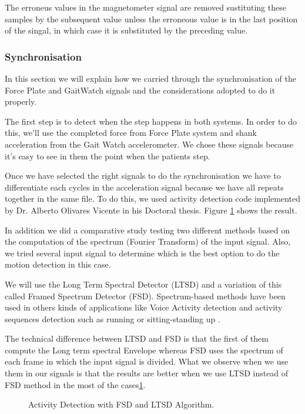 The erroneus values in the magnetometer signal are removed sustituting these samples by the subsequent value unless the erroneous value is in the last position of the singal, in which case it is substituted by the preceding value.

\subsubsection{Synchronisation}	
In this section we will explain how we carried through the synchronisation of the Force Plate and GaitWatch signals and the considerations adopted to do it properly.

The first step is to detect when the step happens in both systems. In order to do this, we’ll use the completed force from Force Plate system and shank acceleration from the Gait Watch accelerometer. We chose these signals because it’s easy to see in them the point when the patients step.

Once we have selected the right signals to do the synchronisation we have to differentiate each cycles in the acceleration signal because we have all repeats together in the same file. To do this, we used activity detection code implemented by Dr. Alberto Olivares Vicente in his Doctoral thesis. Figure \ref{fig:activityDetection} shows the result.

In addition we did a comparative study testing two different methods based on the  computation of the spectrum (Fourier Transform) of the input signal. Also, we tried several input signal to determine which is the best option to do the motion detection in this case.

We will use the Long Term Spectral Detector (LTSD) \cite{Ramirez2004} and a variation of this called Framed Spectrum Detector (FSD). Spectrum-based methods have been used in others kinds of applications like Voice Activity detection \cite{Ramirez2006}\cite{Ramirez2007} and activity sequences detection such as running or sitting-standing up\cite{A.Olivares2013} .

The technical difference between LTSD and FSD is that the first of them compute the Long term spectral Envelope whereas FSD uses the spectrum of each frame  in which the input signal is divided\cite{A.Olivares2013}. What we observe when we use them in our signals is that the results are better when we use LTSD instead of FSD method  in the most of the cases\ref{fig:activityDetection}.

\begin{figure}[H]
	\centering
	\caption{Activity Detection with FSD and LTSD Algorithm.}
	\label{fig:activityDetection}
\end{figure} 


